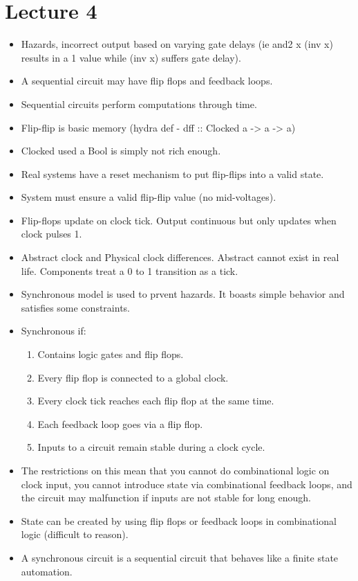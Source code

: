 \documentclass{article}
\begin{document}
\section*{Lecture 4}
\begin{itemize}
\item Hazards, incorrect output based on varying gate delays (ie and2 x (inv x) results in a 1 value while (inv x) suffers gate delay).
\item A sequential circuit may have flip flops and feedback loops.
\item Sequential circuits perform computations through time.
\item Flip-flip is basic memory (hydra def - dff :: Clocked a -> a -> a)
\item Clocked used a Bool is simply not rich enough.
\item Real systems have a reset mechanism to put flip-flips into a valid state.
\item System must ensure a valid flip-flip value (no mid-voltages).
\item Flip-flops update on clock tick. Output continuous but only updates when clock pulses 1.
\item Abstract clock and Physical clock differences. Abstract cannot exist in real life. Components treat a 0 to 1 transition as a tick.
\item Synchronous model is used to prvent hazards. It boasts simple behavior and satisfies some constraints.
\item Synchronous if:
\begin{enumerate}
\item Contains logic gates and flip flops.
\item Every flip flop is connected to a global clock.
\item Every clock tick reaches each flip flop at the same time.
\item Each feedback loop goes via a flip flop.
\item Inputs to a circuit remain stable during a clock cycle.
\end{enumerate}
\item The restrictions on this mean that you cannot do combinational logic on clock input, you cannot introduce state via combinational feedback loops, and the circuit may malfunction if inputs are not stable for long enough.
\item State can be created by using flip flops or feedback loops in combinational logic (difficult to reason).
\item A synchronous circuit is a sequential circuit that behaves like a finite state automation.

\end{itemize}
\end{document}
